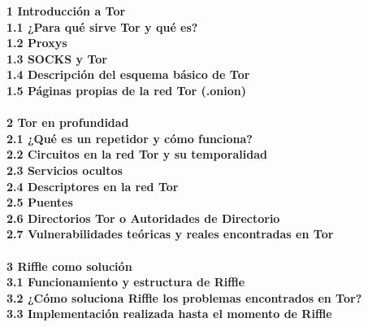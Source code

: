 \Large\textbf{1 Introducción a Tor}\\
\hspace*{20px}\textbf{1.1 ¿Para qué sirve Tor y qué es?}\\
\hspace*{20px}\textbf{1.2 Proxys}\\
\hspace*{20px}\textbf{1.3 SOCKS y Tor}\\
\hspace*{20px}\textbf{1.4 Descripción del esquema básico de Tor}\\
\hspace*{20px}\textbf{1.5 Páginas propias de la red Tor (.onion)}\\ \\

\textbf{2 Tor en profundidad}\\
\hspace*{20px}\textbf{2.1 ¿Qué es un repetidor y cómo funciona?}\\
\hspace*{20px}\textbf{2.2 Circuitos en la red Tor y su temporalidad}\\
\hspace*{20px}\textbf{2.3 Servicios ocultos}\\
\hspace*{20px}\textbf{2.4 Descriptores en la red Tor}\\
\hspace*{20px}\textbf{2.5 Puentes}\\
\hspace*{20px}\textbf{2.6 Directorios Tor o Autoridades de Directorio}\\
\hspace*{20px}\textbf{2.7 Vulnerabilidades teóricas y reales encontradas en Tor}\\ \\

\textbf{3 Riffle como solución}\\
\hspace*{20px}\textbf{3.1 Funcionamiento y estructura de Riffle}\\
\hspace*{20px}\textbf{3.2 ¿Cómo soluciona Riffle los problemas encontrados en Tor?}\\
\hspace*{20px}\textbf{3.3 Implementación realizada hasta el momento de Riffle}
